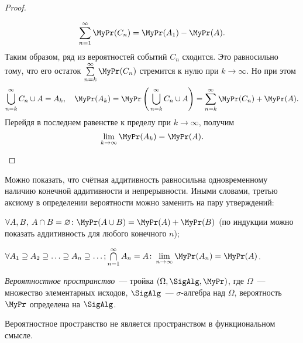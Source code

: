 \begin{proof}
\begin{enumerate}
\begin{gather*}
		      	\sum\limits_{n=1}^{\infty} \MyPr(C_n) = \MyPr(A_1) - \MyPr(A).
		      \end{gather*}
		      Таким образом, ряд из вероятностей событий $C_n$ сходится. 
		      Это равносильно тому, что его остаток $\sum\limits_{n=k}^{\infty} \MyPr(C_n)$ стремится к нулю при $k \to \infty$. 
		      Но при этом
		      \begin{equation*}
		      	\bigcup\limits_{n = k}^{\infty} C_n \cup A = A_k, \quad \MyPr(A_k) = \MyPr\left(\, {\bigcup\limits_{n = k}^{\infty} C_n \cup A} \right) = \sum\limits_{n=k}^{\infty} \MyPr(C_n) + \MyPr(A).
		      \end{equation*}
		      Перейдя в последнем равенстве к пределу при $k \to \infty$, получим
			  \begin{equation*}
				\lim\limits_{k \to \infty} \MyPr(A_k) = \MyPr(A).
			  \end{equation*}
	\end{enumerate}
\end{proof}

\begin{rmrk}
	Можно показать, что счётная аддитивность равносильна одновременному наличию конечной аддитивности и непрерывности. 
	Иными словами, третью аксиому в определении вероятности можно заменить на пару утверждений:
	\begin{compactlist}
		\item 
		      $\forall A, B, \: A \cap B = \varnothing \colon \MyPr(A \cup B) = \MyPr(A) + \MyPr(B)$ 
		      (по индукции можно показать аддитивность для любого конечного $n$);
		\item 
		      $\forall A_1 \supseteq A_2 \supseteq \ldots \supseteq A_n \supseteq \ldots; \bigcap\limits_{n = 1}^{\infty} A_n = A \colon \lim\limits_{n \to \infty}\MyPr(A_n) = \MyPr(A)$.
	\end{compactlist}
\end{rmrk}

\hypertarget{prob_space}{}
\begin{defn}
	\textit{Вероятностное пространство}~--- тройка $(\Omega, \SigAlg, \MyPr)$, где $\Omega$~--- множество элементарных исходов, 
	$\SigAlg$~--- $\sigma$-алгебра над $\Omega$, вероятность $\MyPr$ определена на $\SigAlg$.
\end{defn}
\begin{rmrk}
	Вероятностное пространство не является пространством в функциональном смысле.
\end{rmrk}

